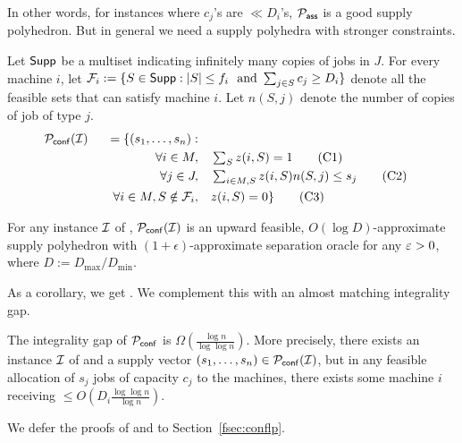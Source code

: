 \noindent
In other words, for instances where $c_j$'s are $\ll D_i$'s, ${\cal P}_\mathsf{ass}$ is a good supply polyhedron. But in general we need a supply polyhedra with stronger constraints. \smallskip

Let $\mathsf{Supp}$ be a multiset indicating infinitely many copies of jobs in $J$.
For every machine $i$, let ${\cal F}_i :=\{S\in \mathsf{Supp}: |S| \leq f_i ~\textrm{ and } \sum_{j\in S} c_j \geq D_i\}$ denote all the feasible sets that can satisfy machine $i$.
Let $n(S,j)$ denote the number of copies of job of type $j$.
\begin{alignat}{4}
	{\cal P}_\mathsf{conf}({\cal I}) && = \{(s_1,\ldots,s_n):  && \notag \\
	&& \quad \forall i \in M,   &\quad  \textstyle \sum_{S} z(i,S)  =  1 \label{feq:conflp1} \tag{C1} \\
	&& \quad \forall j\in J ,  &\quad  \textstyle \sum_{i\in M,S}  z(i,S)n(S,j) \le  s_j \label{feq:conflp2}\tag{C2} \\
	&& \quad \forall i\in M, S\notin {\cal F}_i, & \quad z(i,S)  = 0 \label{feq:conflp3} \} \tag{C3}
\end{alignat}
\begin{theorem}\label{fthm:conflp}
	For any instance ${\cal I}$ of \cckp, ${\cal P}_\mathsf{conf}({\cal I})$ is an upward feasible, $O(\log D)$-approximate supply polyhedron with $(1+\epsilon)$-approximate separation oracle for any $\varepsilon > 0$,
	where $D := D_{\mathrm{max}}/D_\mathrm{min}$.
\end{theorem}
\noindent
As a corollary, we get  .
We complement this with an almost matching integrality gap.
\begin{theorem}
	\label{fthm:conf-ig}
	The integrality gap of ${\cal P}_\mathsf{conf}$ is $\Omega\left(\frac{\log n}{\log\log n}\right)$. More precisely, there exists an instance ${\cal I}$ of \cckp and a supply vector $(s_1,\ldots,s_n) \in {\cal P}_\mathsf{conf}({\cal I})$, but in any feasible allocation of $s_j$ jobs of capacity $c_j$ to the machines, there exists some machine  $i$ receiving $\leq O\left( D_i\frac{\log\log n}{\log n}\right)$.
\end{theorem}
We defer the proofs of  and  to Section~\ref{fsec:conflp}.
